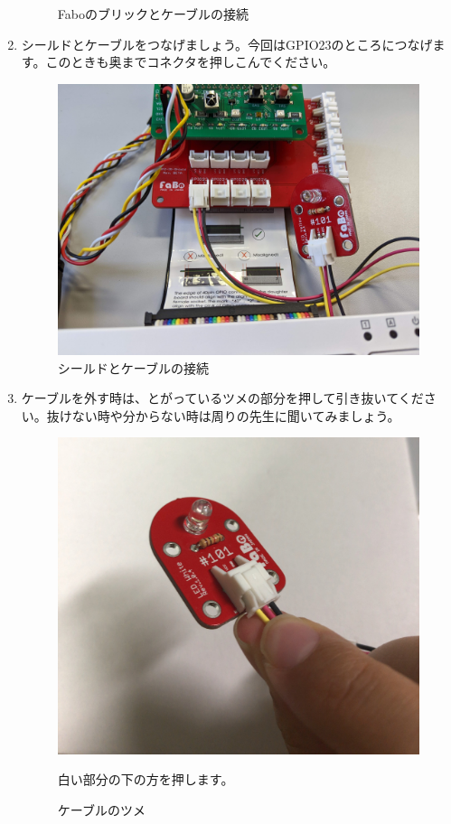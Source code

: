 \begin{enumerate}
\begin{figure}[H]
    \caption{Faboのブリックとケーブルの接続}
  \end{figure}
  \item シールドとケーブルをつなげましょう。今回はGPIO23のところにつなげます。このときも奥までコネクタを押しこんでください。\\
  \begin{figure}[H]
    \centering
    \includegraphics[width=.4\hsize]{images/chap05/led_brk_on_fabo_with_sb_zoomed.jpg}
    \caption{シールドとケーブルの接続}
  \end{figure}
  \item ケーブルを外す時は、とがっているツメの部分を押して引き抜いてください。抜けない時や分からない時は周りの先生に聞いてみましょう。\\
  \begin{figure}[H]
    \begin{minipage}[t]{0.45\columnwidth}
      \centering
      \includegraphics[width=.8\hsize]{images/chap05/text05-img010.jpg}
      \caption{ケーブルのツメ}
      白い部分の下の方を押します。
    \end{minipage}
    \hspace{0.04\columnwidth} %
    \begin{minipage}[t]{0.45\columnwidth}

\end{minipage}
\end{figure}
\end{enumerate}
